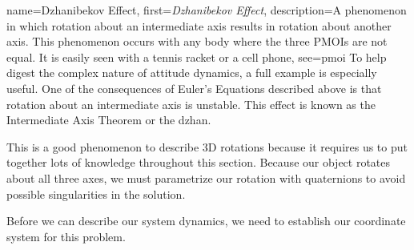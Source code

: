 \documentclass[12pt]{report}
\begin{document}
{
    name={Dzhanibekov Effect},
    first=\textit{Dzhanibekov Effect},
    description={A phenomenon in which rotation about an intermediate axis results in rotation about another axis. This phenomenon occurs with any body where the three PMOIs are not equal. It is easily seen with a tennis racket or a cell phone},
    see={pmoi}
}
To help digest the complex nature of attitude dynamics, a full example is especially useful. One of the consequences of Euler's Equations described %
above is that rotation about an intermediate axis is unstable. This effect is known as the Intermediate Axis Theorem or the \gls{dzhan}.

This is a good phenomenon to describe 3D rotations because it requires us to put together lots of knowledge throughout this section. Because our object rotates about all three axes, we must parametrize our rotation with \glspl{quaternion} to avoid possible singularities in the solution.

Before we can describe our system dynamics, we need to establish our coordinate system for this problem.
\end{document}
